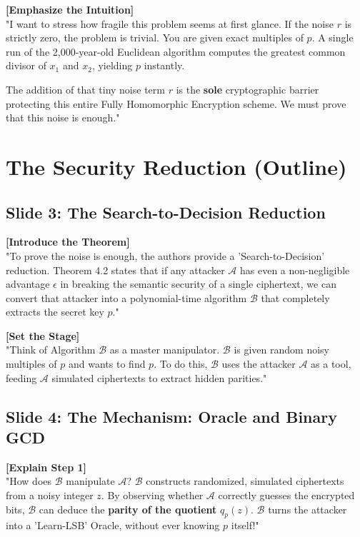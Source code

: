 \documentclass[11pt]{article}
\begin{document}
\textbf{[Emphasize the Intuition]} \\
"I want to stress how fragile this problem seems at first glance. If the noise $r$ is strictly zero, the problem is trivial. You are given exact multiples of $p$. A single run of the 2,000-year-old Euclidean algorithm computes the greatest common divisor of $x_1$ and $x_2$, yielding $p$ instantly. 

The addition of that tiny noise term $r$ is the \textbf{sole} cryptographic barrier protecting this entire Fully Homomorphic Encryption scheme. We must prove that this noise is enough."

\section{The Security Reduction (Outline)}

\subsection*{Slide 3: The Search-to-Decision Reduction}
\textbf{[Introduce the Theorem]} \\
"To prove the noise is enough, the authors provide a 'Search-to-Decision' reduction. Theorem 4.2 states that if any attacker $\mathcal{A}$ has even a non-negligible advantage $\epsilon$ in breaking the semantic security of a single ciphertext, we can convert that attacker into a polynomial-time algorithm $\mathcal{B}$ that completely extracts the secret key $p$."

\textbf{[Set the Stage]} \\
"Think of Algorithm $\mathcal{B}$ as a master manipulator. $\mathcal{B}$ is given random noisy multiples of $p$ and wants to find $p$. To do this, $\mathcal{B}$ uses the attacker $\mathcal{A}$ as a tool, feeding $\mathcal{A}$ simulated ciphertexts to extract hidden parities."

\subsection*{Slide 4: The Mechanism: Oracle and Binary GCD}
\textbf{[Explain Step 1]} \\
"How does $\mathcal{B}$ manipulate $\mathcal{A}$? $\mathcal{B}$ constructs randomized, simulated ciphertexts from a noisy integer $z$. By observing whether $\mathcal{A}$ correctly guesses the encrypted bits, $\mathcal{B}$ can deduce the \textbf{parity of the quotient} $q_p(z)$. $\mathcal{B}$ turns the attacker into a 'Learn-LSB' Oracle, without ever knowing $p$ itself!"
\end{document}
